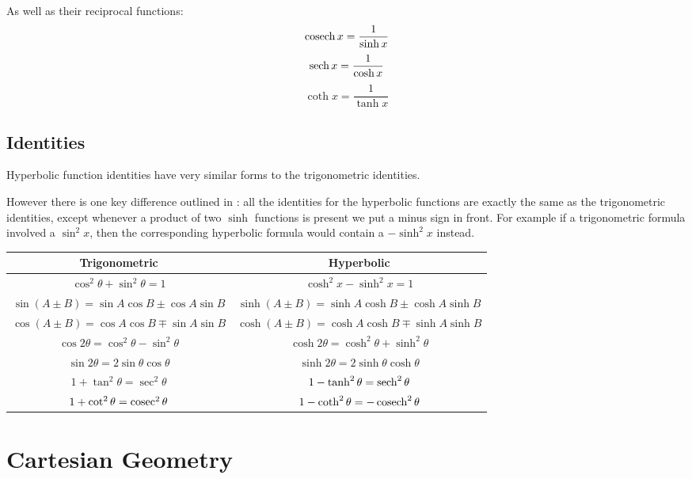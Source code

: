As well as their reciprocal functions:
\begin{equation}
\operatorname{cosech} x = \frac{1}{\sinh x}
\end{equation}
\begin{equation}
\sech x = \frac{1}{\cosh x}
\end{equation}
\begin{equation}
\coth x = \frac{1}{\tanh x}
\end{equation}

\subsection{Identities}
Hyperbolic function identities have very similar forms to the trigonometric identities. 

However there is one key difference outlined in : all the identities for the hyperbolic functions are exactly the same as the trigonometric identities, except whenever a product of two $\sinh$ functions is present we put a minus sign in front. For example if a trigonometric formula involved a $\sin^2x$, then the corresponding hyperbolic formula would contain a $-\sinh^2x$ instead.

\begin{table}[H]
\centering
\begin{tabular}{c|c}
\hline\hline
Trigonometric & Hyperbolic \\
\hline
$\cos^2\theta + \sin^2\theta = 1$ & $\cosh^2x-\sinh^2x = 1$ \\
$\sin(A \pm B) = \sin A \cos B \pm \cos A \sin B$ & $\sinh(A \pm B) = \sinh A \cosh B \pm \cosh A \sinh B$ \\
$\cos(A \pm B) = \cos A \cos B \mp \sin A \sin B$ & $\cosh(A \pm B) = \cosh A \cosh B \mp \sinh A \sinh B$ \\
$\cos 2\theta = \cos^2\theta-\sin^2\theta$ & $\cosh 2\theta = \cosh^2\theta + \sinh^2\theta$ \\
$\sin 2\theta = 2 \sin\theta \cos\theta$ & $\sinh 2\theta = 2 \sinh\theta \cosh\theta$ \\
$1 + \tan^2\theta = \sec^2\theta$ & $1-\tanh^2\theta = \sech^2\theta$ \\
$1 + \cot^2\theta = \operatorname{cosec}^2\theta$ & $1-\coth^2\theta =-\operatorname{cosech}^2\theta$ \\
\hline\hline
\end{tabular}
\end{table}
\pagebreak

\section{Cartesian Geometry}
